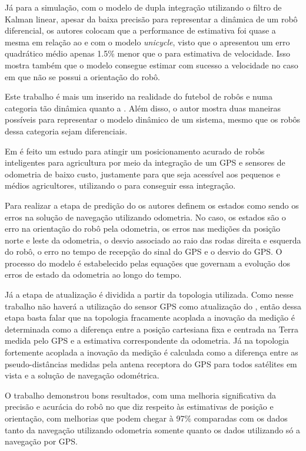 \documentclass[acronym, symbols, table]{fei}
\begin{document}
Já para a simulação, com o modelo de dupla integração utilizando o filtro de Kalman linear, apesar da baixa precisão para representar a dinâmica de um robô diferencial, os autores colocam que a performance de estimativa foi quase a mesma em relação ao  e  com o modelo \textit{unicycle}, visto que o  apresentou um erro quadrático médio apenas 1.5\% menor que o  para estimativa de velocidade. Isso mostra também que o modelo consegue estimar com sucesso a velocidade no caso em que não se possui a orientação do robô.

Este trabalho é mais um inserido na realidade do futebol de robôs e numa categoria tão dinâmica quanto a . Além disso, o autor mostra duas maneiras possíveis para representar o modelo dinâmico de um sistema, mesmo que os robôs dessa categoria sejam diferenciais.

Em \textcite{10333060} é feito um estudo para atingir um posicionamento acurado de robôs inteligentes para agricultura por meio da integração de um GPS e sensores de odometria de baixo custo, justamente para que seja acessível aos pequenos e médios agricultores, utilizando o  para conseguir essa integração.

Para realizar a etapa de predição do  os autores definem os estados como sendo os erros na solução de navegação utilizando odometria. No caso, os estados são o erro na orientação do robô pela odometria, os erros nas medições da posição norte e leste da odometria, o desvio associado ao raio das rodas direita e esquerda do robô, o erro no tempo de recepção do sinal do GPS e o desvio do GPS. O processo do modelo é estabelecido pelas equações que governam a evolução dos erros de estado da odometria ao longo do tempo.

Já a etapa de atualização é dividida a partir da topologia utilizada. Como nesse trabalho não haverá a utilização do sensor GPS como atualização do , então dessa etapa basta falar que na topologia fracamente acoplada a inovação da medição é determinada como a diferença entre a posição cartesiana fixa e centrada na Terra medida pelo GPS e a estimativa correspondente da odometria. Já na topologia fortemente acoplada a inovação da medição é calculada como a diferença entre as pseudo-distâncias medidas pela antena receptora do GPS para todos satélites em vista e a solução de navegação odométrica.

O trabalho demonstrou bons resultados, com uma melhoria significativa da precisão e acurácia do robô no que diz respeito às estimativas de posição e orientação, com melhorias que podem chegar à 97\% comparadas com os dados tanto da navegação utilizando odometria somente quanto os dados utilizando só a navegação por GPS.
\end{document}
